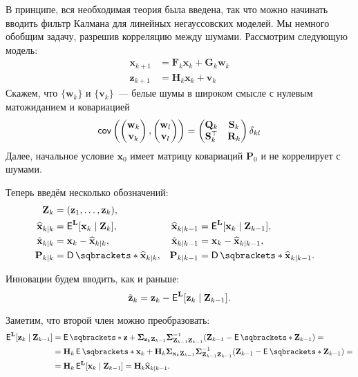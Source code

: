 В принципе, вся необходимая теория была введена, так что можно начинать вводить 
фильтр Калмана для линейных негауссовских моделей. Мы немного обобщим задачу, 
разрешив корреляцию между шумами. Рассмотрим следующую модель:
\begin{align*}
	\mathbf{x}_{k + 1} &= \mathbf{F}_{k}\mathbf{x}_{k} + \mathbf{G}_{k} 
	\mathbf{w}_{k} \\
	\mathbf{z}_{k + 1} &= \mathbf{H}_{k}\mathbf{x}_{k} + \mathbf{v}_{k}
\end{align*}
Скажем, что \(\{\mathbf{w}_{k}\}\) и \(\{\mathbf{v}_{k}\}\)~--- белые шумы в 
широком смысле с нулевым матожиданием и ковариацией
\[
	\operatorname{\mathsf{cov}}\left(
	\begin{pmatrix}
	\mathbf{w}_{k} \\ \mathbf{v}_{k}
	\end{pmatrix}
	,
	\begin{pmatrix}
	\mathbf{w}_{l} \\ \mathbf{v}_{l}
	\end{pmatrix}
	\right)
	=
	\begin{pmatrix}
	\mathbf{Q}_{k} & \mathbf{S}_{k} \\
	\mathbf{S}_{k}^{\top} & \mathbf{R}_{k}
	\end{pmatrix}
	\delta_{kl}
\]
Далее, начальное условие \(\mathbf{x}_{0}\) имеет матрицу ковариаций 
\(\mathbf{P}_{0}\) и не коррелирует с шумами.

Теперь введём несколько обозначений:
\begin{align*}
	\mathbf{Z}_{k} &= (\mathbf{z}_{1}, \ldots, \mathbf{z}_{k}), \\
	\hat{\mathbf{x}}_{k \mid k} &= \E^{\mathbf{L}}[\mathbf{x}_{k} \mid 
	\mathbf{Z}_{k}],& \hat{\mathbf{x}}_{k \mid k - 1} &= 
	\E^{\mathbf{L}}[\mathbf{x}_{k} \mid \mathbf{Z}_{k - 1}], \\
	\tilde{\mathbf{x}}_{k \mid k} &= \mathbf{x}_{k} - \hat{\mathbf{x}}_{k \mid 
	k},& \tilde{\mathbf{x}}_{k \mid k - 1} &= \mathbf{x}_{k} - 
	\hat{\mathbf{x}}_{k \mid k - 1}, \\
	\mathbf{P}_{k \mid k} &= \D{\hat{\mathbf{x}}_{k \mid k}},& \mathbf{P}_{k 
	\mid k - 1} &= \D{\hat{\mathbf{x}}_{k \mid k - 1}}.
\end{align*}

Инновации будем вводить, как и раньше:
\[
	\tilde{\mathbf{z}}_{k} = \mathbf{z}_{k} - \E^{\mathbf{L}}[\mathbf{z}_{k} 
	\mid \mathbf{Z}_{k - 1}].
\]

Заметим, что второй член можно преобразовать:
\begin{align*}
	\E^{\mathbf{L}}[\mathbf{z}_{k} \mid \mathbf{Z}_{k - 1}] &= \E{\mathbf{z}} + 
	\bm{\Sigma}_{\mathbf{z}_{k}\mathbf{Z}_{k - 1}} \bm{\Sigma}_{\mathbf{Z}_{k - 
	1} \mathbf{Z}_{k - 1}}^{-1}(\mathbf{Z}_{k - 1} - \E{\mathbf{Z}_{k - 1}}) = 
	\\
	&= \mathbf{H}_{k}\E{\mathbf{x}_{k}} + 
	\mathbf{H}_{k}\bm{\Sigma}_{\mathbf{x}_{k}\mathbf{Z}_{k - 1}} 
	\bm{\Sigma}_{\mathbf{Z}_{k - 1} \mathbf{Z}_{k - 1}}^{-1}(\mathbf{Z}_{k - 1} 
	- \E{\mathbf{Z}_{k - 1}}) = \\
	&= \mathbf{H}_{k}\E^{\mathbf{L}}[\mathbf{x}_{k} \mid \mathbf{Z}_{k - 1}] = 
	\mathbf{H}_{k}\hat{\mathbf{x}}_{k \mid k - 1}.
\end{align*}

